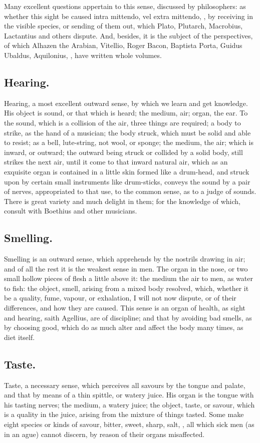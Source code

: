 {Many excellent questions appertain to this sense, discussed by
philosophers: as whether this sight be caused intra mittendo, vel extra
mittendo, \etc{}, by receiving in the visible species, or sending of them
out, which Plato, Plutarch, Macrobius, Lactantius
and others dispute. And, besides, it is the subject of the
perspectives, of which Alhazen the Arabian, Vitellio, Roger Bacon,
Baptista Porta, Guidus Ubaldus, Aquilonius, \etc{}, have written whole
volumes.
\subsection{Hearing.}
Hearing, a most excellent outward sense, by which we learn
and get knowledge. His object is sound, or that which is heard; the
medium, air; organ, the ear. To the sound, which is a collision of the
air, three things are required; a body to strike, as the hand of a
musician; the body struck, which must be solid and able to resist; as a
bell, lute-string, not wool, or sponge; the medium, the air; which is
inward, or outward; the outward being struck or collided by a solid
body, still strikes the next air, until it come to that inward natural
air, which as an exquisite organ is contained in a little skin formed
like a drum-head, and struck upon by certain small instruments like
drum-sticks, conveys the sound by a pair of nerves, appropriated to
that use, to the common sense, as to a judge of sounds. There is great
variety and much delight in them; for the knowledge of which, consult
with Boethius and other musicians.
\subsection{Smelling.}
Smelling is an outward sense, which apprehends by the
nostrils drawing in air; and of all the rest it is the weakest sense in
men. The organ in the nose, or two small hollow pieces of flesh a
little above it: the medium the air to men, as water to fish: the
object, smell, arising from a mixed body resolved, which, whether it be
a quality, fume, vapour, or exhalation, I will not now dispute, or of
their differences, and how they are caused. This sense is an organ of
health, as sight and hearing, saith Agellius, are of discipline;
and that by avoiding bad smells, as by choosing good, which do as much
alter and affect the body many times, as diet itself.
\subsection{Taste.}
Taste, a necessary sense, which perceives all savours by the
tongue and palate, and that by means of a thin spittle, or watery
juice. His organ is the tongue with his tasting nerves; the medium, a
watery juice; the object, taste, or savour, which is a quality in the
juice, arising from the mixture of things tasted. Some make eight
species or kinds of savour, bitter, sweet, sharp, salt, \etc{}, all which
sick men (as in an ague) cannot discern, by reason of their organs
misaffected.
}
